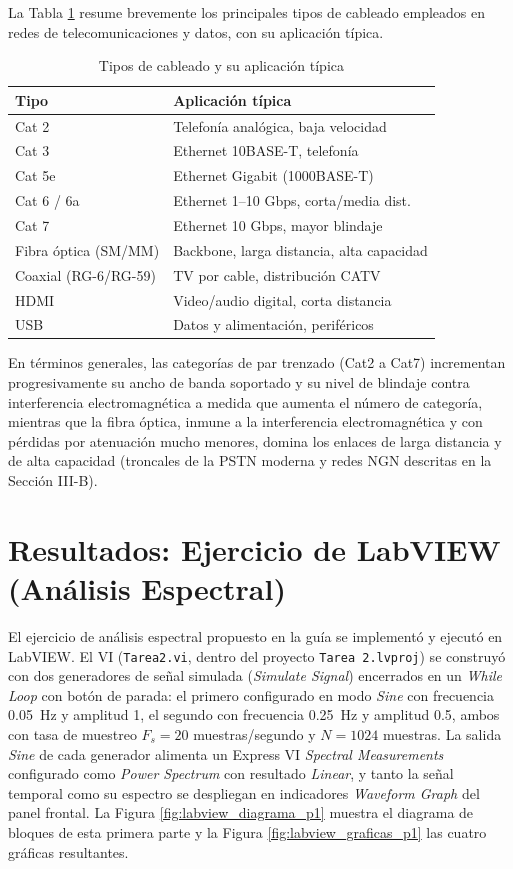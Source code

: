 \documentclass[conference]{IEEEtran}
\begin{document}
La Tabla \ref{tab:cableado} resume brevemente los principales tipos de cableado empleados en redes de telecomunicaciones y datos, con su aplicación típica.

\begin{table}[!t]
\centering
\caption{Tipos de cableado y su aplicación típica}
\label{tab:cableado}
\begin{tabular}{|l|l|}
\hline
\textbf{Tipo} & \textbf{Aplicación típica} \\ \hline
Cat 2 & Telefonía analógica, baja velocidad \\ \hline
Cat 3 & Ethernet 10BASE-T, telefonía \\ \hline
Cat 5e & Ethernet Gigabit (1000BASE-T) \\ \hline
Cat 6 / 6a & Ethernet 1--10 Gbps, corta/media dist. \\ \hline
Cat 7 & Ethernet 10 Gbps, mayor blindaje \\ \hline
Fibra óptica (SM/MM) & Backbone, larga distancia, alta capacidad \\ \hline
Coaxial (RG-6/RG-59) & TV por cable, distribución CATV \\ \hline
HDMI & Video/audio digital, corta distancia \\ \hline
USB & Datos y alimentación, periféricos \\ \hline
\end{tabular}
\end{table}

En términos generales, las categorías de par trenzado (Cat2 a Cat7) incrementan progresivamente su ancho de banda soportado y su nivel de blindaje contra interferencia electromagnética a medida que aumenta el número de categoría, mientras que la fibra óptica, inmune a la interferencia electromagnética y con pérdidas por atenuación mucho menores, domina los enlaces de larga distancia y de alta capacidad (troncales de la PSTN moderna y redes NGN descritas en la Sección III-B).

\section{Resultados: Ejercicio de LabVIEW (Análisis Espectral)}

El ejercicio de análisis espectral propuesto en la guía se implementó y ejecutó en LabVIEW. El VI (\texttt{Tarea2.vi}, dentro del proyecto \texttt{Tarea 2.lvproj}) se construyó con dos generadores de señal simulada (\textit{Simulate Signal}) encerrados en un \textit{While Loop} con botón de parada: el primero configurado en modo \textit{Sine} con frecuencia 0.05~Hz y amplitud 1, el segundo con frecuencia 0.25~Hz y amplitud 0.5, ambos con tasa de muestreo $F_s=20$ muestras/segundo y $N=1024$ muestras. La salida \textit{Sine} de cada generador alimenta un Express VI \textit{Spectral Measurements} configurado como \textit{Power Spectrum} con resultado \textit{Linear}, y tanto la señal temporal como su espectro se despliegan en indicadores \textit{Waveform Graph} del panel frontal. La Figura \ref{fig:labview_diagrama_p1} muestra el diagrama de bloques de esta primera parte y la Figura \ref{fig:labview_graficas_p1} las cuatro gráficas resultantes.
\end{document}
